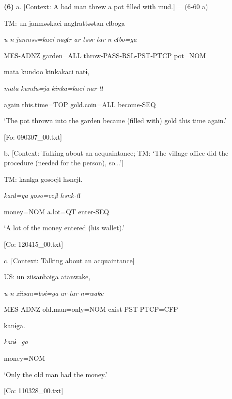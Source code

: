 \textbf{(6)}  a.  [Context: A bad man threw a pot filled with mud.] = (6-60 a)

    TM:  un  janməəkaci  nagɨrattəətan  cɨboga

      \textit{u-n}  \textit{janməə=kaci}  \textit{nagɨr-ar-təər-tar-n}  \textit{cɨbo=ga}

      MES-ADNZ  garden=ALL  throw-PASS-RSL-PST-PTCP  pot=NOM

      mata  kundoo  kinkakaci  natɨ,

      \textit{mata}  \textit{kundu=ja}  \textit{kinka=kaci}  \textit{nar-tɨ}

      again  this.time=TOP  gold.coin=ALL  become-SEQ

      ‘The pot thrown into the garden became (filled with) gold this time again.’

      [Fo: 090307\_00.txt]

  b.  [Context: Talking about an acquaintance; TM: ‘The village office did the procedure (needed for the person), so...’]

    TM:  kanɨga  {\textbar}goso{\textbar}cjɨ  həncjɨ.

      \textit{kanɨ=ga}  \textit{goso=ccjɨ}  \textit{hənk-tɨ}

      money=NOM  a.lot=QT  enter-SEQ

      ‘A lot of the money entered (his wallet).’

      [Co: 120415\_00.txt]

  c.  [Context: Talking about an acquaintance]

    US:  un  ziisanbəiga  atanwake,

      \textit{u-n}  \textit{ziisan=bəi=ga}  \textit{ar-tar-n=wake}

      MES-ADNZ  old.man=only=NOM  exist-PST-PTCP=CFP

      kanɨga.

      \textit{kanɨ=ga}

      money=NOM

      ‘Only the old man had the money.’

      [Co: 110328\_00.txt]
